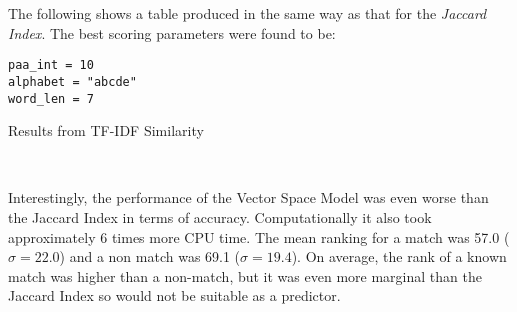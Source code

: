 \documentclass[../report.tex]{subfiles}
\begin{document}
	The following shows a table produced in the same way as that for the \textit{Jaccard Index}.  The best scoring parameters were found to be:
\begin{verbatim}
paa_int = 10
alphabet = "abcde"
word_len = 7
\end{verbatim}

\begin{table}[H]
	\caption{Results from TF-IDF Similarity}
	\\
\end{table}

	Interestingly, the performance of the Vector Space Model was even worse than the Jaccard Index in terms of accuracy.  Computationally it also took approximately 6 times more CPU time.  The mean ranking for a match was 57.0 ($\sigma = 22.0$) and a non match was 69.1 ($\sigma = 19.4$).  On average, the rank of a known match was higher than a non-match, but it was even more marginal than the Jaccard Index so would not be suitable as a predictor.
	
\end{document}
